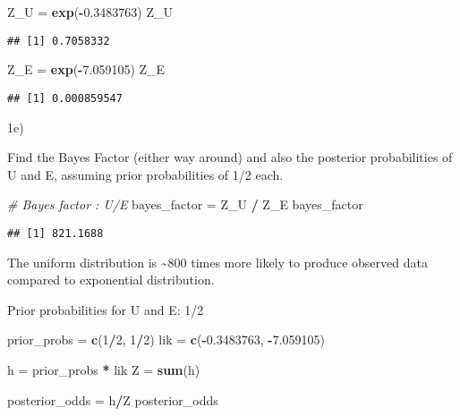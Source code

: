 \documentclass[
]{article}
\newenvironment{Shaded}{\begin{snugshade}}{\end{snugshade}}
\newcommand{\CommentTok}[1]{\textcolor[rgb]{0.56,0.35,0.01}{\textit{#1}}}
\newcommand{\DecValTok}[1]{\textcolor[rgb]{0.00,0.00,0.81}{#1}}
\newcommand{\FloatTok}[1]{\textcolor[rgb]{0.00,0.00,0.81}{#1}}
\newcommand{\FunctionTok}[1]{\textcolor[rgb]{0.13,0.29,0.53}{\textbf{#1}}}
\newcommand{\NormalTok}[1]{#1}
\newcommand{\OtherTok}[1]{\textcolor[rgb]{0.56,0.35,0.01}{#1}}
\newcommand{\SpecialCharTok}[1]{\textcolor[rgb]{0.81,0.36,0.00}{\textbf{#1}}}
\begin{document}
\begin{Shaded}
\begin{Highlighting}[]
\NormalTok{Z\_U }\OtherTok{=} \FunctionTok{exp}\NormalTok{(}\SpecialCharTok{{-}}\FloatTok{0.3483763}\NormalTok{)}
\NormalTok{Z\_U}
\end{Highlighting}
\end{Shaded}

\begin{verbatim}
## [1] 0.7058332
\end{verbatim}

\begin{Shaded}
\begin{Highlighting}[]
\NormalTok{Z\_E }\OtherTok{=} \FunctionTok{exp}\NormalTok{(}\SpecialCharTok{{-}}\FloatTok{7.059105}\NormalTok{)}
\NormalTok{Z\_E}
\end{Highlighting}
\end{Shaded}

\begin{verbatim}
## [1] 0.000859547
\end{verbatim}

1e)

Find the Bayes Factor (either way around) and also the posterior
probabilities of U and E, assuming prior probabilities of 1/2 each.

\begin{Shaded}
\begin{Highlighting}[]
\CommentTok{\# Bayes factor : U/E}
\NormalTok{bayes\_factor }\OtherTok{=}\NormalTok{  Z\_U }\SpecialCharTok{/}\NormalTok{ Z\_E}
\NormalTok{bayes\_factor}
\end{Highlighting}
\end{Shaded}

\begin{verbatim}
## [1] 821.1688
\end{verbatim}

The uniform distribution is \textasciitilde800 times more likely to
produce observed data compared to exponential distribution.

Prior probabilities for U and E: 1/2

\begin{Shaded}
\begin{Highlighting}[]
\NormalTok{prior\_probs }\OtherTok{=} \FunctionTok{c}\NormalTok{(}\DecValTok{1}\SpecialCharTok{/}\DecValTok{2}\NormalTok{, }\DecValTok{1}\SpecialCharTok{/}\DecValTok{2}\NormalTok{)}
\NormalTok{lik }\OtherTok{=} \FunctionTok{c}\NormalTok{(}\SpecialCharTok{{-}}\FloatTok{0.3483763}\NormalTok{, }\SpecialCharTok{{-}}\FloatTok{7.059105}\NormalTok{)}

\NormalTok{h }\OtherTok{=}\NormalTok{ prior\_probs }\SpecialCharTok{*}\NormalTok{ lik}
\NormalTok{Z }\OtherTok{=} \FunctionTok{sum}\NormalTok{(h)}

\NormalTok{posterior\_odds }\OtherTok{=}\NormalTok{ h}\SpecialCharTok{/}\NormalTok{Z}
\NormalTok{posterior\_odds}
\end{Highlighting}
\end{Shaded}
\end{document}

